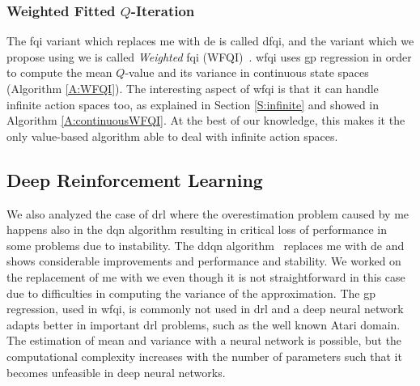 \subsubsection{Weighted Fitted $Q$-Iteration}
The \gls{fqi} variant which replaces \gls{me} with \gls{de} is called \gls{dfqi}, and the variant which we propose using \gls{we} is called \textit{Weighted} \gls{fqi} (WFQI)~\cite{deramo2017maximum}. \gls{wfqi} uses \gls{gp} regression in order to compute the mean $Q$-value and its variance in continuous state spaces (Algorithm \ref{A:WFQI}). The interesting aspect of \gls{wfqi} is that it can handle infinite action spaces too, as explained in Section \ref{S:infinite} and showed in Algorithm \ref{A:continuousWFQI}. At the best of our knowledge, this makes it the only value-based algorithm able to deal with infinite action spaces.

\subsection{Deep Reinforcement Learning}
We also analyzed the case of \gls{drl} where the overestimation problem caused by \gls{me} happens also in the \gls{dqn} algorithm resulting in critical loss of performance in some problems due to instability. The \gls{ddqn} algorithm~\cite{hasselt2015double} replaces \gls{me} with \gls{de} and shows considerable improvements and performance and stability. We worked on the replacement of \gls{me} with \gls{we} even though it is not straightforward in this case due to difficulties in computing the variance of the approximation. The \gls{gp} regression, used in \gls{wfqi}, is commonly not used in \gls{drl} and a deep neural network adapts better in important \gls{drl} problems, such as the well known Atari domain. The estimation of mean and variance with a neural network is possible, but the computational complexity increases with the number of parameters such that it becomes unfeasible in deep neural networks.

